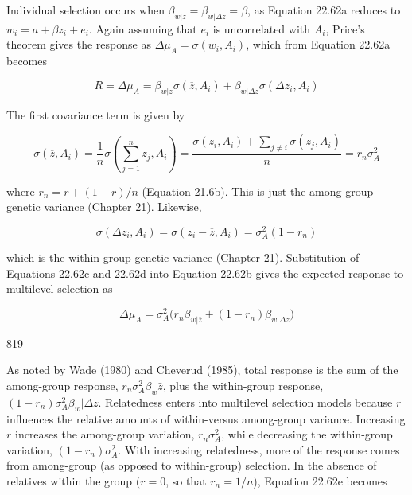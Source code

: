 \documentclass{article}
\begin{document}
Individual selection occurs when  $ \beta_{w|\overline{z}} = \beta_{w|\Delta z} = \beta $, as Equation 22.62a reduces to  $ w_i = a + \beta z_i + e_i $. Again assuming that  $ e_i $ is uncorrelated with  $ A_i $, Price's theorem gives the response as  $ \Delta\mu_A = \sigma(w_i, A_i) $, which from Equation 22.62a becomes

\begin{equation}
R=\Delta\mu_{A}=\beta_{w|\overline{{z}}}\sigma(\overline{{z}},A_{i})+\beta_{w|\Delta z}\sigma(\Delta z_{i},A_{i})
\tag{22.62b}
\label{eq:22_62b}
\end{equation}

The first covariance term is given by

\begin{equation}
\sigma(\overline{z},A_{i})=\frac{1}{n}\sigma\left(\sum_{j=1}^{n}z_{j},A_{i}\right)=\frac{\sigma(z_{i},A_{i})+\sum_{j\neq i}\sigma(z_{j},A_{i})}{n}=r_{n}\sigma_{A}^{2}
\tag{22.62c}
\label{eq:22_62c}
\end{equation}

where  $ r_{n} = r + (1 - r)/n $ (Equation 21.6b). This is just the among-group genetic variance (Chapter 21). Likewise,

\begin{equation}
\sigma(\Delta z_{i},A_{i})=\sigma\left(z_{i}-\overline{z},A_{i}\right)=\sigma_{A}^{2}\left(1-r_{n}\right)
\tag{22.62d}
\label{eq:22_62d}
\end{equation}

which is the within-group genetic variance (Chapter 21). Substitution of Equations 22.62c and 22.62d into Equation 22.62b gives the expected response to multilevel selection as

\begin{equation}
\Delta\mu_{A}=\sigma_{A}^{2}\bigg(r_{n}\beta_{w|\overline{{z}}}+(1-r_{n})\beta_{w|\Delta z}\bigg)
\tag{22.62e}
\label{eq:22_62e}
\end{equation}

819

As noted by Wade (1980) and Cheverud (1985), total response is the sum of the among-group response,  $ r_n \sigma_A^2 \beta_{w} \bar{z} $, plus the within-group response,  $ (1 - r_n) \sigma_A^2 \beta_{w} |\Delta z $. Relatedness enters into multilevel selection models because  $ r $ influences the relative amounts of within-versus among-group variance. Increasing  $ r $ increases the among-group variation,  $ r_n \sigma_A^2 $, while decreasing the within-group variation,  $ (1 - r_n) \sigma_A^2 $. With increasing relatedness, more of the response comes from among-group (as opposed to within-group) selection. In the absence of relatives within the group  $ (r = 0 $, so that  $ r_n = 1/n $), Equation 22.62e becomes
\end{document}
